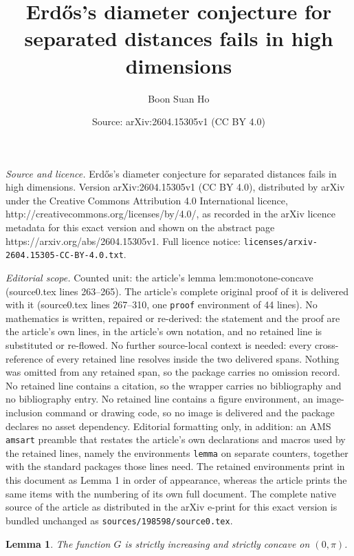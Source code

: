 \documentclass[10pt,a4paper]{amsart}
\title{Erd\H{o}s's diameter conjecture for separated distances fails in high dimensions}
\author{Boon Suan Ho}
\date{Source: arXiv:2604.15305v1 (CC BY 4.0)}
\newtheorem{lemma}{Lemma}
\begin{document}
\maketitle

\noindent\emph{Source and licence.} Erd\H{o}s's diameter conjecture for separated distances fails in high dimensions. Version arXiv:2604.15305v1 (CC BY 4.0), distributed by arXiv under the Creative Commons Attribution 4.0 International licence, http://creativecommons.org/licenses/by/4.0/, as recorded in the arXiv licence metadata for this exact version and shown on the abstract page https://arxiv.org/abs/2604.15305v1. Full licence notice: \texttt{licenses/arxiv-2604.15305-CC-BY-4.0.txt}.\par\smallskip

\noindent\textit{Editorial scope.} Counted unit: the article's lemma lem:monotone-concave (source0.tex lines 263--265). The article's complete original proof of it is delivered with it (source0.tex lines 267--310, one \texttt{proof} environment of 44 lines). No mathematics is written, repaired or re-derived: the statement and the proof are the article's own lines, in the article's own notation, and no retained line is substituted or re-flowed.  No further source-local context is needed: every cross-reference of every retained line resolves inside the two delivered spans.  Nothing was omitted from any retained span, so the package carries no omission record.  No retained line contains a citation, so the wrapper carries no bibliography and no bibliography entry.  No retained line contains a figure environment, an image-inclusion command or drawing code, so no image is delivered and the package declares no asset dependency.  Editorial formatting only, in addition: an AMS \texttt{amsart} preamble that restates the article's own declarations and macros used by the retained lines, namely the environments \texttt{lemma} on separate counters, together with the standard packages those lines need.  The retained environments print in this document as Lemma 1 in order of appearance, whereas the article prints the same items with the numbering of its own full document.  The complete native source of the article as distributed in the arXiv e-print for this exact version is bundled unchanged as \texttt{sources/198598/source0.tex}.
\begin{lemma}\label{lem:monotone-concave}
The function $G$ is strictly increasing and strictly concave on $(0,\pi)$.
\end{lemma}
\end{document}

